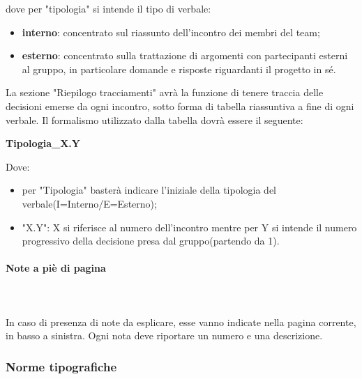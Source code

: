 		dove per "tipologia" si intende il tipo di verbale:
		\begin{itemize}
			\item \textbf{interno}: concentrato sul riassunto dell'incontro dei membri del team;
			\item \textbf{esterno}: concentrato sulla trattazione di argomenti con partecipanti esterni al gruppo, in particolare domande e risposte riguardanti il progetto in sé.
		\end{itemize}
		La sezione "Riepilogo tracciamenti" avrà la funzione di tenere traccia delle decisioni emerse da ogni incontro, sotto forma di tabella riassuntiva a fine di ogni verbale. Il formalismo utilizzato dalla tabella dovrà essere il seguente: \newline \newline
		\centerline{\textbf{Tipologia\_X.Y}} \newline \newline
		Dove:
		\begin{itemize}
			\item per "Tipologia" basterà indicare l'iniziale della tipologia del verbale(I=Interno/E=Esterno);
			\item "X.Y": X si riferisce al numero dell'incontro mentre per Y si intende il numero progressivo della decisione presa dal gruppo(partendo da 1).
		\end{itemize}	
		\paragraph{Note a piè di pagina} \mbox{}\\ \mbox{}\\
		In caso di presenza di note da esplicare, esse vanno indicate nella pagina corrente, in basso a sinistra. Ogni nota deve riportare un numero e una descrizione.		
	\subsubsection{Norme tipografiche}
